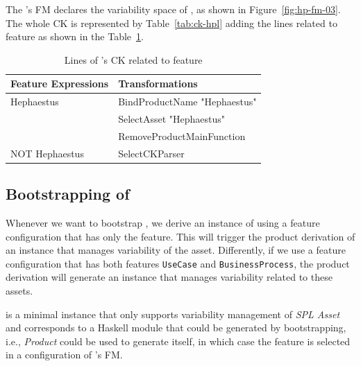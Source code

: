 The \hpl{}'s FM declares the variability space of \hpl{}, as shown in Figure~\ref{fig:hp-fm-03}. The whole  CK is represented by Table~\ref{tab:ck-hpl} adding the lines related to \texttt{\hp{}} feature as shown in the Table~\ref{tab:ck-hpl-2}.


\begin{table}[h]
\begin{center}
\begin{tabular}{||l||l||}
  \hline
  \textbf{Feature Expressions} & \textbf{Transformations}   \\  \hline
  Hephaestus & BindProductName "Hephaestus" \\
             &  SelectAsset "Hephaestus"   \\
             &  RemoveProductMainFunction \\ \hline
  NOT Hephaestus & SelectCKParser \\ \hline
\end{tabular}
\caption{Lines of \hpl's CK related to \texttt{\hp{}} feature}
\label{tab:ck-hpl-2}
\end{center}
\end{table}


\subsection{Bootstrapping of \hpl} 
\label{sec:hpl-bootstrapping}

Whenever we want to bootstrap \hpl, we derive an instance of \hpl{} using a feature configuration that has only the \texttt{\hp{}} feature. This will trigger the product derivation of an instance that manages variability of the \hp{} asset. Differently, if we use a feature configuration that has both features \texttt{UseCase} and \texttt{BusinessProcess}, the product derivation will generate an \hpl{} instance that manages variability related to these assets.

\hpproduct{} is a minimal \hpl{} instance that only supports variability management of \hp{} \emph{SPL Asset} and corresponds to a Haskell module that could be generated by bootstrapping, i.e., \hp{} \emph{Product} could be used to generate itself, in which case the \hp{} feature is selected in a configuration of \hpl's FM. 

